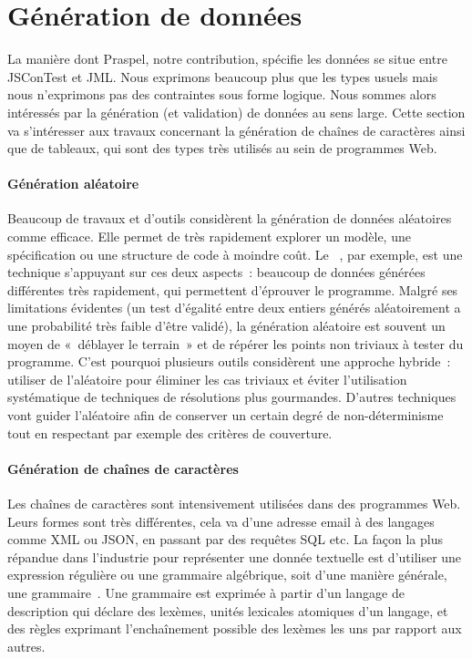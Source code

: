\section{Génération de données}
\label{section:sota:data_generation}

La manière dont Praspel, notre contribution, spécifie les données se situe entre
JSConTest et JML. Nous exprimons beaucoup plus que les types usuels mais nous
n'exprimons pas des contraintes sous forme logique. Nous sommes alors
intéressés par la génération (et validation) de données au sens large. Cette
section va s'intéresser aux travaux concernant la génération de chaînes de
caractères ainsi que de tableaux, qui sont des types très utilisés au sein de
programmes Web.

\paragraph{Génération aléatoire} Beaucoup de travaux et d'outils considèrent la
génération de données aléatoires comme efficace. Elle permet de très rapidement
explorer un modèle, une spécification ou une structure de code à moindre coût.
Le ~, par exemple, est une technique
s'appuyant sur ces deux aspects~: beaucoup de données générées différentes très
rapidement, qui permettent d'éprouver le programme. Malgré ses limitations
évidentes (un test d'égalité entre deux entiers générés aléatoirement a une
probabilité très faible d'être validé), la génération aléatoire est souvent un
moyen de «~déblayer le terrain~» et de répérer les points non triviaux à tester
du programme. C'est pourquoi plusieurs outils considèrent une approche hybride~:
utiliser de l'aléatoire pour éliminer les cas triviaux et éviter l'utilisation
systématique de techniques de résolutions plus gourmandes. D'autres techniques
vont guider l'aléatoire afin de conserver un certain degré de non-déterminisme
tout en respectant par exemple des critères de couverture.

\paragraph{Génération de chaînes de caractères} Les chaînes de caractères sont
intensivement utilisées dans des programmes Web.  Leurs formes sont très
différentes, cela va d'une adresse email à des langages comme XML ou JSON, en
passant par des requêtes SQL etc. La façon la plus répandue dans l'industrie
pour représenter une donnée textuelle est d'utiliser une expression régulière ou
une grammaire algébrique, soit d'une manière générale, une
grammaire~. Une grammaire est exprimée à partir d'un {\strong
langage de description} qui déclare des {\strong lexèmes}, unités lexicales
atomiques d'un langage, et des {\strong règles} exprimant l'enchaînement
possible des lexèmes les uns par rapport aux autres.

